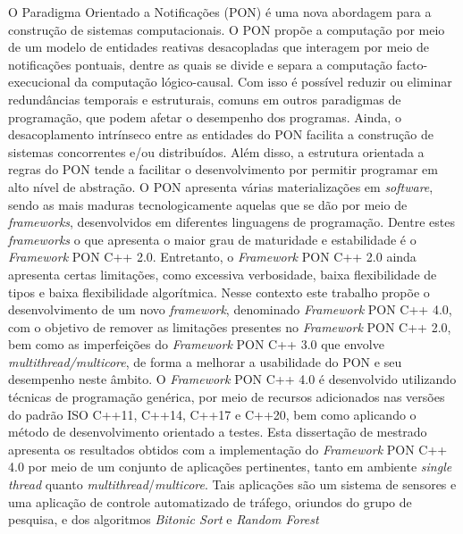 
\begin{resumoutfpr}%
O Paradigma Orientado a Notificações (PON) é uma nova abordagem para a
construção de sistemas computacionais. O PON propõe a computação por meio de um
modelo de entidades reativas desacopladas que interagem por meio de notificações
pontuais, dentre as quais se divide e separa a computação facto-execucional da
computação lógico-causal. Com isso é possível reduzir ou eliminar redundâncias
temporais e estruturais, comuns em outros paradigmas de programação, que podem
afetar o desempenho dos programas. Ainda, o desacoplamento intrínseco entre as
entidades do PON facilita a construção de sistemas concorrentes e/ou
distribuídos. Além disso, a estrutura orientada a regras do PON tende a
facilitar o desenvolvimento por permitir programar em alto nível de abstração. O
PON apresenta várias materializações em \textit{software}, sendo as mais maduras
tecnologicamente aquelas que se dão por meio de \textit{frameworks},
desenvolvidos em diferentes linguagens de programação. Dentre estes
\textit{frameworks} o que apresenta o maior grau de maturidade e estabilidade é
o \textit{Framework} PON C++ 2.0. Entretanto, o \textit{Framework} PON C++ 2.0
ainda apresenta certas limitações, como excessiva verbosidade, baixa
flexibilidade de tipos e baixa flexibilidade algorítmica. Nesse contexto este
trabalho propõe o desenvolvimento de um novo \textit{framework}, denominado
\textit{Framework} PON C++ 4.0, com o objetivo de remover as limitações
presentes no \textit{Framework} PON C++ 2.0, bem como as imperfeições do
\textit{Framework} PON C++ 3.0  que envolve \textit{multithread/multicore}, de
forma a melhorar a usabilidade do PON e seu desempenho neste âmbito. O
\textit{Framework} PON C++ 4.0 é desenvolvido utilizando técnicas de programação
genérica, por meio de recursos adicionados nas versões do padrão ISO C++11,
C++14, C++17 e C++20, bem como aplicando o método de desenvolvimento orientado a
testes. Esta dissertação de mestrado apresenta os resultados obtidos com a
implementação do \textit{Framework} PON C++ 4.0 por meio de um conjunto de
aplicações pertinentes, tanto em ambiente \textit{single thread} quanto
\textit{multithread}/\textit{multicore}. Tais aplicações são um sistema de
sensores e uma aplicação de controle automatizado de tráfego, oriundos do grupo
de pesquisa, e dos algoritmos \textit{Bitonic Sort} e \textit{Random Forest}

\end{resumoutfpr}
